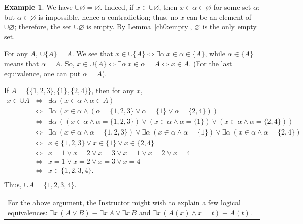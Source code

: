 \documentclass[12pt,notitlepage]{article}
\theoremstyle{plain}
\theoremstyle{definition}
\newtheorem{exm}[thm]{Example}
\theoremstyle{plain}
\newcommand{\void}{\varnothing}
\newcommand{\1}{\mathbf{1}}
\newcommand{\0}{\mathbf{0}}
\newcommand{\mcomm}[1]{
\medskip\noindent\begin{tabular}{| l}
\parbox{0.99\textwidth}{{\small
#1 }}\end{tabular}
\smallskip}
\begin{document}
\begin{exm}\label{sets:fin_union}
We have $\cup \void = \void$. Indeed, if $x \in \cup \void$, then $x \in \alpha \in \void$ for some set $\alpha$; but $\alpha \in \void$ is impossible, hence a contradiction; thus, no $x$ can be an element of $\cup \void$; therefore, the set $\cup \void$ is empty. By Lemma~\ref{ch0:empty}, $\void$ is the only empty set.

For any $A$, $\cup \{ A \} = A$. We see that $x \in \cup \{ A\} \iff \exists \alpha\ x \in \alpha \in \{ A \}$, while $\alpha \in \{A \}$ means that $\alpha = A$. So, $x \in \cup \{ A\} \iff \exists \alpha\ x \in \alpha = A \iff x \in A$. (For the last equivalence, one can put $\alpha = A$).

If $A = \{ \{1,2,3\}, \{1\}, \{2,4\}\}$, then for any $x$,
$$
\begin{array}{rcl}
x \in \cup A &\iff& \exists \alpha\ (x \in \alpha \wedge \alpha \in A)\\
		&\iff& \exists \alpha\ (x \in \alpha \wedge (\alpha = \{1,2,3\} \vee \alpha = \{1\} \vee \alpha = \{2,4\}))\\
		&\iff& \exists \alpha\ ((x \in \alpha \wedge \alpha = \{1,2,3\}) \vee (x \in \alpha \wedge \alpha = \{1\}) \vee (x \in \alpha \wedge \alpha = \{2,4\}))\\
		&\iff& \exists \alpha\ (x \in \alpha \wedge \alpha = \{1,2,3\}) \vee \exists \alpha\ (x \in \alpha \wedge \alpha = \{1\}) \vee \exists \alpha\ (x \in \alpha \wedge \alpha = \{2,4\})\\
		&\iff& x \in \{1,2,3\}  \vee   x \in \{1\} \vee x \in \{2,4\} \\
		&\iff& x = 1 \vee x = 2 \vee x = 3 \vee x = 1 \vee x = 2 \vee x = 4\\
		&\iff& x = 1 \vee x = 2 \vee x = 3 \vee x = 4\\
		&\iff& x \in \{1,2,3,4\}.\\
\end{array}
$$
Thus, $\cup A = \{1,2,3,4\}$.

\mcomm{For the above argument, the Instructor might wish to explain a few logical equivalences: $\exists x\, (A \vee B) \equiv \exists x\, A \vee \exists x\, B$ and $\exists x\, (A(x) \wedge x = t) \equiv A(t)$.}
\end{exm}
\end{document}
